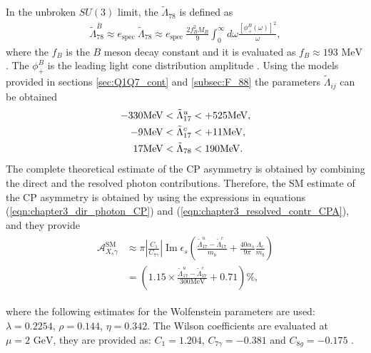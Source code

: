 In the unbroken $SU(3)$ limit, the $\tilde{\Lambda}_{78}$ is defined as
\begin{eqnarray}
\tilde{\Lambda}_{78}^{\bar{B}} \approx e_{\text {spec }} \tilde{\Lambda}_{78} \approx e_{\text {spec }} \frac{2 f_{B}^{2} M_{B}}{9} \int_{0}^{\infty} d \omega \frac{\left[\phi_{+}^{B}(\omega)\right]^{2}}{\omega},
\end{eqnarray}
where the $f_{B}$ is the $B$ meson decay constant and it is evaluated as $f_{B}\approx 193\text{ MeV}$ \cite{Benzke:2010tq}. The $\phi_{+}^{B}$ is the leading light cone distribution amplitude \cite{Grozin:1996pq}. Using the models provided in sections \ref{sec:Q1Q7_cont} and \ref{subsec:F_88} the parameters $\tilde{\Lambda}_{ij}$ can be obtained \cite{Benzke:2010tq}
\vspace*{-0.6cm}
\begin{eqnarray}
\begin{aligned}
-330 \mathrm{MeV} &<\tilde{\Lambda}_{17}^{u}<+525 \mathrm{MeV}, \\
-9 \mathrm{MeV} &<\tilde{\Lambda}_{17}^{c}<+11 \mathrm{MeV}, \\
17 \mathrm{MeV} &<\tilde{\Lambda}_{78}<190 \mathrm{MeV}.
\end{aligned}
\vspace*{-0.5cm}
\end{eqnarray}
The complete theoretical estimate of the CP asymmetry is obtained by  combining the direct and the resolved photon contributions. Therefore, the SM estimate of the CP asymmetry is obtained by using the expressions in equations (\ref{eqn:chapter3_dir_photon_CP}) and (\ref{eqn:chapter3_resolved_contr_CPA}), and they provide
\vspace*{-0.6cm}
\begin{eqnarray}\label{eqn:resolved_p_cont_CP}
\begin{aligned}
\mathcal{A}_{X_{s} \gamma}^{\mathrm{SM}} & \approx \pi\left|\frac{C_{1}}{C_{7 \gamma}}\right| \operatorname{Im} \epsilon_{s}\left(\frac{\tilde{\Lambda}_{17}^{u}-\tilde{\Lambda}_{17}^{c}}{m_{b}}+\frac{40 \alpha_{s}}{9 \pi} \frac{\Lambda_{c}}{m_{b}}\right) \\
&=\left(1.15 \times \frac{\tilde{\Lambda}_{17}^{u}-\tilde{\Lambda}_{17}^{c}}{300 \mathrm{MeV}}+0.71\right) \%,
\end{aligned}
\end{eqnarray}

where the following estimates for the Wolfenstein parameters are used: $\lambda=0.2254$, $\rho=0.144$, $\eta=0.342$. The Wilson coefficients are evaluated at $\mu=2\text{ GeV}$, they are provided as: $C_{1}=1.204$, $C_{7\gamma}=-0.381$ and $C_{8g}=-0.175$ \cite{Benzke:2010tq}. 
